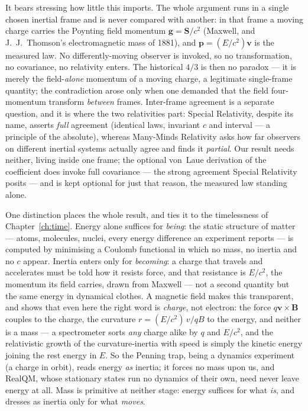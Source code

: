 It bears stressing how little this imports. The whole argument runs in a single chosen inertial frame and is never
compared with another: in that frame a moving charge carries the Poynting field momentum $\mathbf g=\mathbf S/c^2$
(Maxwell, and J.~J.~Thomson's electromagnetic mass of 1881), and $\mathbf p=(E/c^2)\mathbf v$ is the measured law.
No differently-moving observer is invoked, so no transformation, no covariance, no relativity enters. The
historical $4/3$ is then no paradox --- it is merely the field-\emph{alone} momentum of a moving charge, a
legitimate single-frame quantity; the contradiction arose only when one demanded that the field four-momentum
transform \emph{between} frames. Inter-frame agreement is a separate question, and it is where the two relativities
part: Special Relativity, despite its name, asserts \emph{full} agreement (identical laws, invariant $c$ and
interval --- a principle of the absolute), whereas Many-Minds Relativity asks how far observers on different
inertial systems actually agree and finds it \emph{partial}. Our result needs neither, living inside one frame; the
optional von~Laue derivation of the coefficient does invoke full covariance --- the strong agreement Special
Relativity posits --- and is kept optional for just that reason, the measured law standing alone.

One distinction places the whole result, and ties it to the timelessness of Chapter~\ref{ch:time}. Energy alone
suffices for \emph{being}: the static structure of matter --- atoms, molecules, nuclei, every energy difference an
experiment reports --- is computed by minimising a Coulomb functional in which no mass, no inertia and no $c$
appear. Inertia enters only for \emph{becoming}: a charge that travels and accelerates must be told how it resists
force, and that resistance is $E/c^2$, the momentum its field carries, drawn from Maxwell --- not a second quantity
but the same energy in dynamical clothes. A magnetic field makes this transparent, and shows that even here the
right word is \emph{charge}, not electron: the force $q\mathbf v\times\mathbf B$ couples to the charge, the
curvature $r=(E/c^2)\,v/qB$ to the energy, and neither is a mass --- a spectrometer sorts \emph{any} charge alike
by $q$ and $E/c^2$, and the relativistic growth of the curvature-inertia with speed is simply the kinetic energy
joining the rest energy in $E$. So the Penning trap, being a dynamics experiment (a charge in orbit),
reads energy \emph{as} inertia; it forces no mass upon us, and RealQM, whose stationary states run no dynamics of
their own, need never leave energy at all. Mass is primitive at neither stage: energy suffices for what \emph{is},
and dresses as inertia only for what \emph{moves}.

